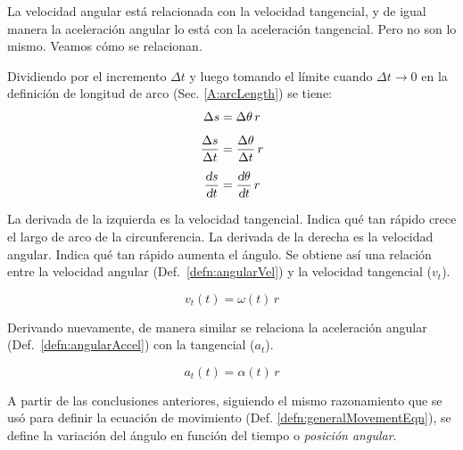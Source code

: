 La velocidad angular está relacionada con la velocidad tangencial, y de igual manera la aceleración angular lo está con la aceleración tangencial.
Pero no son lo mismo.
Veamos cómo se relacionan.

Dividiendo por el incremento $\Delta t$ y luego tomando el límite cuando $\Delta t \to 0$ en la definición de longitud de arco (Sec. \ref{A:arcLength}) se tiene:
\begin{align*}
    \Delta s &= \Delta \theta \, r
    \\[1ex]
    \frac{\Delta s}{\Delta t} &= \frac{\Delta \theta}{\Delta t} \, r
    \\[1ex]
    \frac{\textsl{d} s}{\textsl{d} t} &= \frac{\textsl{d} \theta}{\textsl{d} t} \, r
\end{align*}

La derivada de la izquierda es la velocidad tangencial.
Indica qué tan rápido crece el largo de arco de la circunferencia.
La derivada de la derecha es la velocidad angular.
Indica qué tan rápido aumenta el ángulo.
Se obtiene así una relación entre la velocidad angular (Def.\ \ref{defn:angularVel}) y la velocidad tangencial ($v_t$).

\begin{mdframed}[style=PropertyFrame]
    \begin{prop}
        \label{prop:circularVel}
    \end{prop}
    \begin{equation*}
        v_t(t) = \omega(t) \, r
    \end{equation*}
\end{mdframed}

Derivando nuevamente, de manera similar se relaciona la aceleración angular (Def.\ \ref{defn:angularAccel}) con la tangencial ($a_t$).

\begin{mdframed}[style=PropertyFrame]
    \begin{prop}
        \label{prop:circularAccel}
    \end{prop}
    \begin{equation*}
        a_t(t) = \alpha(t) \, r
    \end{equation*}
\end{mdframed}

A partir de las conclusiones anteriores, siguiendo el mismo razonamiento que se usó para definir la ecuación de movimiento (Def. \ref{defn:generalMovementEqn}), se define la variación del ángulo en función del tiempo o \emph{posición angular}.

